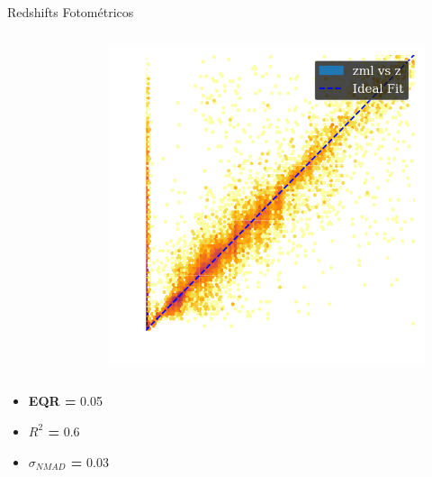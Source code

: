 \begin{frame}[c]{Redshifts Fotométricos}
\begin{columns}[c]
\begin{column}{0.32\linewidth}
\begin{figure}
            \end{figure}
        \end{column}
        \begin{column}{0.32\linewidth}
            \begin{figure}
                \centering
                \includegraphics[width=\linewidth]{images/zml.png}
            \end{figure}
        \end{column}
    \end{columns}
    \begin{splusbox}{}
        \tiny
        \begin{itemize}
            \item \textbf{EQR =} 0.05
            \item \textbf{$R^2$ =} 0.6
            \item \textbf{$\sigma_{NMAD}$ =} 0.03
        \end{itemize}
    \end{splusbox}
\end{frame}


